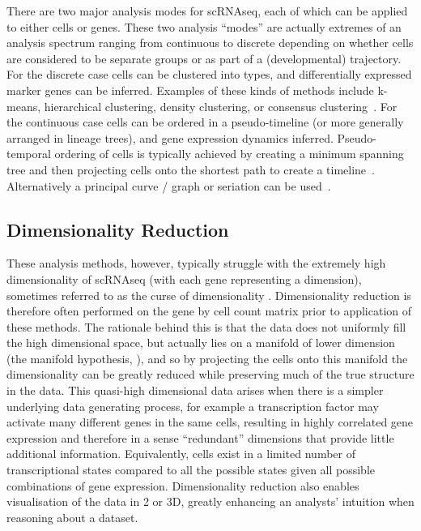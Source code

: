 There are two major analysis modes for scRNAseq, each of which can be applied to either cells or genes.
These two analysis ``modes'' are actually extremes of an analysis spectrum ranging from continuous to discrete depending on whether cells are considered to be separate groups or as part of a (developmental) trajectory.
For the discrete case cells can be clustered into types, and differentially expressed marker genes can be inferred.
Examples of these kinds of methods include k-means, hierarchical clustering, density clustering, or consensus clustering~\parencite{Zurauskiene2016pcaReduce,Kiselev2017SC3,Guo2015SINCERA,Satija2015Spatial}.
For the continuous case cells can be ordered in a pseudo-timeline (or more generally arranged in lineage trees), and gene expression dynamics inferred.
Pseudo-temporal ordering of cells is typically achieved by creating a minimum spanning tree and then projecting cells onto the shortest path to create a timeline~\parencite{Trapnell2014dynamics,Ji2016TSCAN}.
Alternatively a principal curve / graph or seriation can be used~\parencite{Marco2014Bifurcation,Qiu2017Reversed}.

\subsection{Dimensionality Reduction}

These analysis methods, however, typically struggle with the extremely high dimensionality of scRNAseq (with each gene representing a dimension), sometimes referred to as the curse of dimensionality \parencite{Donoho2000HighDimensional}.
Dimensionality reduction is therefore often performed on the gene by cell count matrix prior to application of these methods.
The rationale behind this is that the data does not uniformly fill the high dimensional space, but actually lies on a manifold of lower dimension (the manifold hypothesis, \cite{Moon2018Manifold}), and so by projecting the cells onto this manifold the dimensionality can be greatly reduced while preserving much of the true structure in the data.
This quasi-high dimensional data arises when there is a simpler underlying data generating process, for example a transcription factor may activate many different genes in the same cells, resulting in highly correlated gene expression and therefore in a sense ``redundant'' dimensions that provide little additional information.
Equivalently, cells exist in a limited number of transcriptional states compared to all the possible states given all possible combinations of gene expression.
Dimensionality reduction also enables visualisation of the data in 2 or 3D, greatly enhancing an analysts' intuition when reasoning about a dataset.

